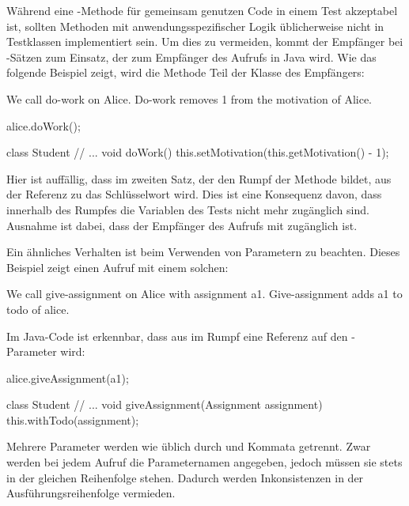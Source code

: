 Während eine -Methode für gemeinsam genutzen Code in einem Test akzeptabel ist, sollten Methoden mit anwendungsspezifischer Logik üblicherweise nicht in Testklassen implementiert sein.
Um dies zu vermeiden, kommt der Empfänger bei -Sätzen zum Einsatz, der zum Empfänger des Aufrufs in Java wird.
Wie das folgende Beispiel zeigt, wird die Methode Teil der Klasse des Empfängers:

\begin{codeblock}
    We call do-work on Alice.
    Do-work removes 1 from the motivation of Alice.
\end{codeblock}

\begin{jcodeblock}
    alice.doWork();

    class Student {
        // ...
        void doWork() {
            this.setMotivation(this.getMotivation() - 1);
        }
    }
\end{jcodeblock}

Hier ist auffällig, dass im zweiten Satz, der den Rumpf der Methode bildet, aus der Referenz zu  das Schlüsselwort  wird.
Dies ist eine Konsequenz davon, dass innerhalb des Rumpfes die Variablen des Tests nicht mehr zugänglich sind.
Ausnahme ist dabei, dass der Empfänger des Aufrufs mit  zugänglich ist.

Ein ähnliches Verhalten ist beim Verwenden von Parametern zu beachten.
Dieses Beispiel zeigt einen Aufruf mit einem solchen:

\begin{codeblock}
    We call give-assignment on Alice with assignment a1.
    Give-assignment adds a1 to todo of alice.
\end{codeblock}

Im Java-Code ist erkennbar, dass aus  im Rumpf eine Referenz auf den -Parameter wird:

\begin{jcodeblock}
    alice.giveAssignment(a1);

    class Student {
        // ...
        void giveAssignment(Assignment assignment) {
            this.withTodo(assignment);
        }
    }
\end{jcodeblock}

Mehrere Parameter werden wie üblich durch  und Kommata getrennt.
Zwar werden bei jedem Aufruf die Parameternamen angegeben, jedoch müssen sie stets in der gleichen Reihenfolge stehen.
Dadurch werden Inkonsistenzen in der Ausführungsreihenfolge vermieden.

